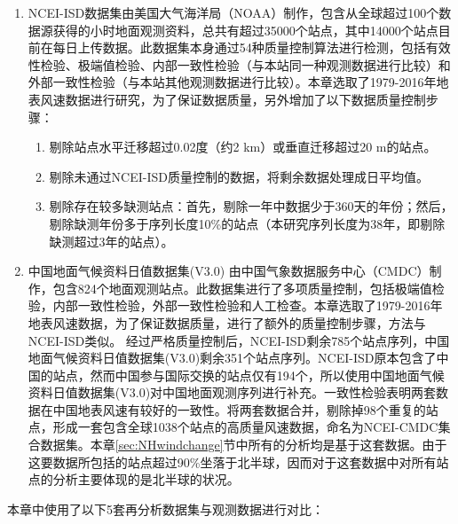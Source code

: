 \begin{enumerate}
\item NCEI-ISD数据集\citep{smith2011the}由美国大气海洋局（NOAA）制作，包含从全球超过100个数据源获得的小时地面观测资料，总共有超过35000个站点，其中14000个站点目前在每日上传数据。此数据集本身通过54种质量控制算法进行检测，包括有效性检验、极端值检验、内部一致性检验（与本站同一种观测数据进行比较）和外部一致性检验（与本站其他观测数据进行比较）。本章选取了1979-2016年地表风速数据进行研究，为了保证数据质量，另外增加了以下数据质量控制步骤：
\begin{enumerate}
\item 剔除站点水平迁移超过0.02度（约2 km）或垂直迁移超过20 m的站点。
\item 剔除未通过NCEI-ISD质量控制的数据，将剩余数据处理成日平均值。
\item 剔除存在较多缺测站点：首先，剔除一年中数据少于360天的年份；然后，剔除缺测年份多于序列长度10\%的站点（本研究序列长度为38年，即剔除缺测超过3年的站点）。
\end{enumerate}
\item 中国地面气候资料日值数据集(V3.0) 由中国气象数据服务中心（CMDC）制作，包含824个地面观测站点。此数据集进行了多项质量控制，包括极端值检验，内部一致性检验，外部一致性检验和人工检查。本章选取了1979-2016年地表风速数据，为了保证数据质量，进行了额外的质量控制步骤，方法与NCEI-ISD类似。
经过严格质量控制后，NCEI-ISD剩余785个站点序列，中国地面气候资料日值数据集(V3.0)剩余351个站点序列。NCEI-ISD原本包含了中国的站点，然而中国参与国际交换的站点仅有194个，所以使用中国地面气候资料日值数据集(V3.0)对中国地面观测序列进行补充。一致性检验表明两套数据在中国地表风速有较好的一致性。将两套数据合并，剔除掉98个重复的站点，形成一套包含全球1038个站点的高质量风速数据，命名为NCEI-CMDC集合数据集。本章\ref{sec:NHwindchange}节中所有的分析均是基于这套数据。由于这要数据所包括的站点超过90\%坐落于北半球，因而对于这套数据中对所有站点的分析主要体现的是北半球的状况。
\end{enumerate}

本章中使用了以下5套再分析数据集与观测数据进行对比：

